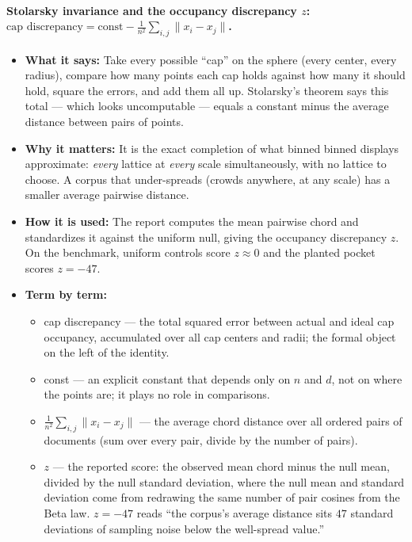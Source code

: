 \documentclass[11pt,letterpaper]{article}
\begin{document}
\paragraph{Stolarsky invariance and the occupancy discrepancy $z$:
$\text{cap discrepancy} = \text{const} - \frac{1}{n^2} \sum_{i,j} \lVert
x_i - x_j \rVert$.}
\begin{itemize}
  \item \textbf{What it says:} Take every possible ``cap'' on the sphere
  (every center, every radius), compare how many points each cap holds
  against how many it should hold, square the errors, and add them all up.
  Stolarsky's theorem says this total --- which looks uncomputable ---
  equals a constant minus the average distance between pairs of points.
  \item \textbf{Why it matters:} It is the exact completion of what binned
  binned displays approximate: \emph{every} lattice at \emph{every}
  scale simultaneously, with no lattice to choose. A corpus that
  under-spreads (crowds anywhere, at any scale) has a smaller average
  pairwise distance.
  \item \textbf{How it is used:} The report computes the mean pairwise
  chord and standardizes it against the uniform null, giving the occupancy
  discrepancy $z$. On the benchmark, uniform controls score $z \approx 0$
  and the planted pocket scores $z = -47$.
  \item \textbf{Term by term:}
  \begin{itemize}
    \item cap discrepancy --- the total squared error between actual and
    ideal cap occupancy, accumulated over all cap centers and radii; the
    formal object on the left of the identity.
    \item const --- an explicit constant that depends only on $n$ and $d$,
    not on where the points are; it plays no role in comparisons.
    \item $\frac{1}{n^2}\sum_{i,j} \lVert x_i - x_j \rVert$ --- the average
    chord distance over all ordered pairs of documents (sum over every
    pair, divide by the number of pairs).
    \item $z$ --- the reported score: the observed mean chord minus the
    null mean, divided by the null standard deviation, where the null mean
    and standard deviation come from redrawing the same number of pair
    cosines from the Beta law. $z = -47$ reads ``the corpus's average
    distance sits $47$ standard deviations of sampling noise below the
    well-spread value.''
  \end{itemize}
\end{itemize}
\end{document}
